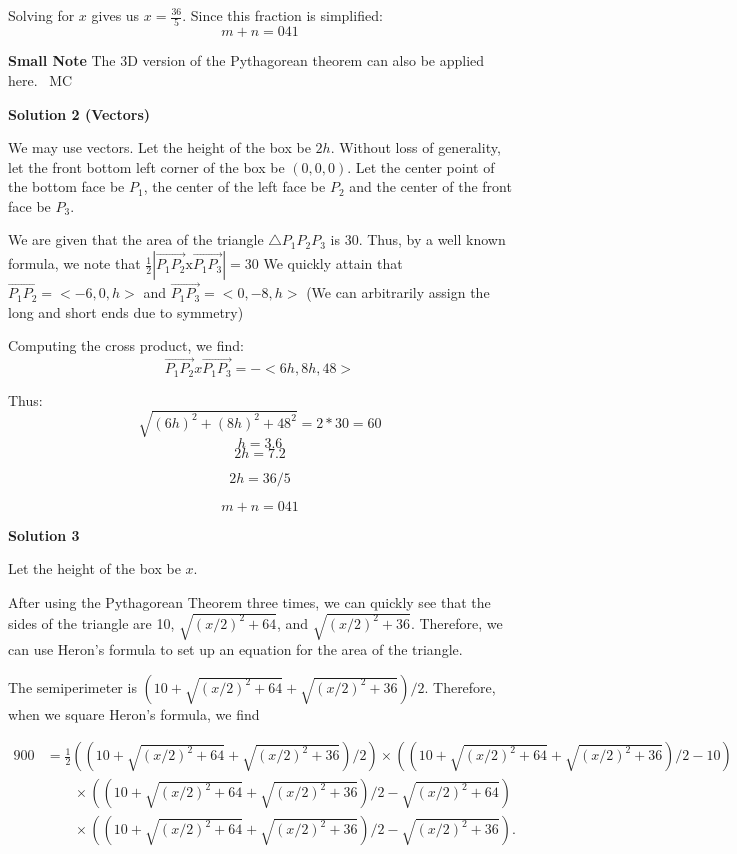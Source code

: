 \begin{enumerate}
 Solving for $x$ gives us $x=\frac{36}{5}$. Since this fraction is simplified:
 \[m+n=\boxed{041}\]

 \textbf{Small Note} The 3D version of the Pythagorean theorem can also be applied here. ~MC

 



\textbf{Solution 2 (Vectors)}

We may use vectors. Let the height of the box be $2h$. Without loss of generality, let the front bottom left corner of the box be $(0,0,0)$. Let the center point of the bottom face be $P_1$, the center of the left face be $P_2$ and the center of the front face be $P_3$.

 We are given that the area of the triangle $\triangle P_1 P_2 P_3$ is $30$. Thus, by a well known formula, we note that $\frac{1}{2}|\vec{P_1P_2} \text{x} \vec{P_1P_3}|=30$ We quickly attain that $\vec{P_1P_2}=<-6,0,h>$ and $\vec{P_1P_3}=<0,-8,h>$ (We can arbitrarily assign the long and short ends due to symmetry)

 Computing the cross product, we find:
 \[\vec{P_1P_2} x \vec{P_1P_3}=-<6h,8h,48>\]

 Thus:
 \[\sqrt{(6h)^2+(8h)^2+48^2}=2*30=60\]
 \[h=3.6\]
 \[2h=7.2\]

 \[2h=36/5\]

 \[m+n=\boxed{041}\]




\textbf{Solution 3}

Let the height of the box be $x$.

 After using the Pythagorean Theorem three times, we can quickly see that the sides of the triangle are 10, $\sqrt{(x/2)^2 + 64}$, and $\sqrt{(x/2)^2 + 36}$. Therefore, we can use Heron's formula to set up an equation for the area of the triangle.

 The semiperimeter is $\left(10 + \sqrt{(x/2)^2 + 64} + \sqrt{(x/2)^2 + 36}\right)/2$. Therefore, when we square Heron's formula, we find

 
 \begin{align*}900 &= \frac{1}{2}\left(\left(10 + \sqrt{(x/2)^2 + 64} + \sqrt{(x/2)^2 + 36}\right)/2\right)\times\left(\left(10 + \sqrt{(x/2)^2 + 64} + \sqrt{(x/2)^2 + 36}\right)/2 - 10\right)\\&\qquad\times\left(\left(10 + \sqrt{(x/2)^2 + 64} + \sqrt{(x/2)^2 + 36}\right)/2 - \sqrt{(x/2)^2 + 64}\right)\\&\qquad\times\left(\left(10 + \sqrt{(x/2)^2 + 64} + \sqrt{(x/2)^2 + 36}\right)/2 - \sqrt{(x/2)^2 + 36}\right).\end{align*}



\end{enumerate}
